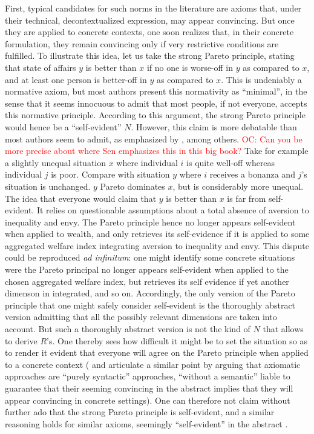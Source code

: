 \documentclass[preprint, french, english, 11pt, authoryear]{elsarticle}%
\newcommand{\commentOC}[1]{\textcolor{red}{OC: #1}}
\begin{document}
First, typical candidates for such norms in the literature are axioms that, under their technical, decontextualized expression, may appear convincing. But once they are applied to concrete contexts, one soon realizes that, in their concrete formulation, they remain convincing only if very restrictive conditions are fulfilled. To illustrate this idea, let us take the strong Pareto principle, stating that state of affairs $y$ is better than $x$ if no one is worse-off in $y$ as compared to $x$, and at least one person is better-off in $y$ as compared to $x$. This is undeniably a normative axiom, but most authors present this normativity as “minimal”, in the sense that it seems innocuous to admit that most people, if not everyone, accepts this normative principle. According to this argument, the strong Pareto principle would hence be a “self-evident” $N$. However, this claim is more debatable than most authors seem to admit, as emphasized by \cite{sen_rationality_2004}, among others. \commentOC{Can you be more precise about where Sen emphasizes this in this big book?} Take for example a slightly unequal situation $x$ where individual $i$ is quite well-off whereas individual $j$ is poor. Compare with situation $y$ where $i$ receives a bonanza and $j$'s situation is unchanged. $y$ Pareto dominates $x$, but is considerably more unequal. The idea that everyone would claim that $y$ is better than $x$ is far from self-evident. It relies on questionable assumptions about a total absence of aversion to inequality and envy. The Pareto principle hence no longer appears self-evident when applied to wealth, and only retrieves its self-evidence if it is applied to some aggregated welfare index integrating aversion to inequality and envy. This dispute could be reproduced \emph{ad infinitum}: one might identify some concrete situations were the Pareto principal no longer appears self-evident when applied to the chosen aggregated welfare index, but retrieves its self evidence if yet another dimenson in integrated, and so on. Accordingly, the only version of the Pareto principle that one might safely consider self-evident is the thoroughly abstract version admitting that all the possibly relevant dimensions are taken into account. But such a thoroughly abstract version is not the kind of $N$ that allows to derive $R$’s. One thereby sees how difficult it might be to set the situation so as to render it evident that everyone will agree on the Pareto principle when applied to a concrete context (\citet{mongin_axiomatisation_2003} and \citet{baujard_bien-etre_2015} articulate a similar point by arguing that axiomatic approaches are “purely syntactic” approaches, “without a semantic” liable to guarantee that their seeming convincing in the abstract implies that they will appear convincing in concrete settings). One can therefore not claim without further ado that the strong Pareto principle is self-evident, and a similar reasoning holds for similar axioms, seemingly “self-evident” in the abstract \citep{sen_maximization_1997}.
\end{document}
